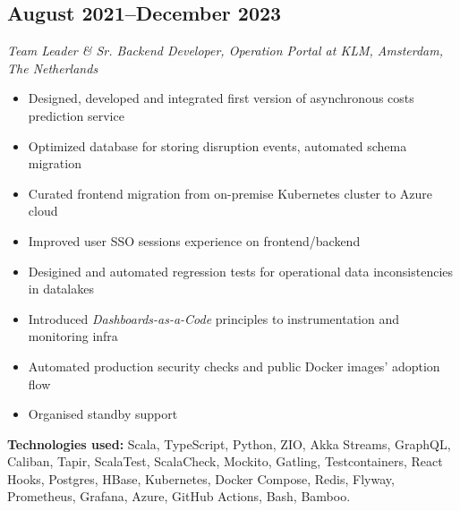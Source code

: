 \subsection*{August 2021--December 2023}

\textit{Team Leader \& Sr. Backend Developer, Operation Portal at KLM, Amsterdam, The Netherlands}

\begin{itemize}[noitemsep]
  \item Designed, developed and integrated first version of asynchronous costs prediction service
  \item Optimized database for storing disruption events, automated schema migration
  \item Curated frontend migration from on-premise Kubernetes cluster to Azure cloud
  \item Improved user SSO sessions experience on frontend/backend
  \item Desigined and automated regression tests for operational data inconsistencies in datalakes
  \item Introduced \textit{Dashboards-as-a-Code} principles to instrumentation and monitoring infra
  \item Automated production security checks and public Docker images' adoption flow
  \item Organised standby support
\end{itemize}

\textbf{Technologies used:}
Scala, TypeScript, Python, ZIO, Akka Streams, GraphQL, Caliban, Tapir,
ScalaTest, ScalaCheck, Mockito, Gatling, Testcontainers, React Hooks, Postgres, HBase, Kubernetes, Docker Compose,
Redis, Flyway, Prometheus, Grafana, Azure, GitHub Actions, Bash, Bamboo.
